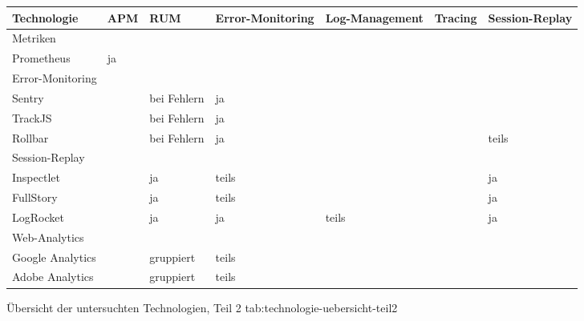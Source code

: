 %
{
\begin{tabular}{|p{2.25cm}|p{1.5cm}|p{2.0cm}|p{3.0cm}|p{3.0cm}|p{1.5cm}|p{2.5cm}|}
\hline
Technologie & APM & RUM & Error-Mo\-ni\-tor\-ing & Log-Management & Tracing & Session-Replay \\
\hline
\multicolumn{7}{|p{15.75cm}|}{Metriken} \\
\hline
Prometheus & ja &  &  &  &  &  \\
\hline
\multicolumn{7}{|p{15.75cm}|}{Error-Monitoring} \\
\hline
Sentry &  & bei \mbox{Fehlern} & ja &  &  &  \\
\hline
TrackJS &  & bei \mbox{Fehlern} & ja &  &  &  \\
\hline
Rollbar &  & bei \mbox{Fehlern} & ja &  &  & teils \\
\hline
\multicolumn{7}{|p{15.75cm}|}{Session-Replay} \\
\hline
Inspectlet &  & ja & teils &  &  & ja \\
\hline
FullStory &  & ja & teils &  &  & ja \\
\hline
LogRocket &  & ja & ja & teils &  & ja \\
\hline
\multicolumn{7}{|p{15.75cm}|}{Web-Analytics} \\
\hline
Google Analytics &  & gruppiert & teils &  &  &  \\
\hline
Adobe Analytics &  & gruppiert & teils &  &  &  \\
\hline
\end{tabular}
}
{Übersicht der untersuchten Technologien, Teil 2}
{tab:technologie-uebersicht-teil2}